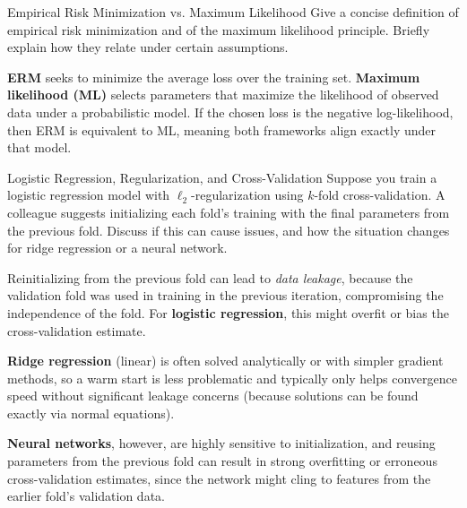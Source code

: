 \documentclass{article}
\begin{document}
\begin{exercise}{Empirical Risk Minimization vs. Maximum Likelihood}
  Give a concise definition of empirical risk minimization and of the maximum likelihood principle. Briefly explain how they relate under certain assumptions.

  \begin{solution}
    \textbf{ERM} seeks to minimize the average loss over the training set.  
    \textbf{Maximum likelihood (ML)} selects parameters that maximize the likelihood of observed data under a probabilistic model.  
    If the chosen loss is the negative log-likelihood, then ERM is equivalent to ML, meaning both frameworks align exactly under that model.
  \end{solution}
\end{exercise}

\begin{exercise}{Logistic Regression, Regularization, and Cross-Validation}
  Suppose you train a logistic regression model with $\ell_2$-regularization using $k$-fold cross-validation. A colleague suggests initializing each fold's training with the final parameters from the previous fold. Discuss if this can cause issues, and how the situation changes for ridge regression or a neural network.

  \begin{solution}
    Reinitializing from the previous fold can lead to \emph{data leakage}, because the validation fold was used in training in the previous iteration, compromising the independence of the fold. For \textbf{logistic regression}, this might overfit or bias the cross-validation estimate.  

    \textbf{Ridge regression} (linear) is often solved analytically or with simpler gradient methods, so a warm start is less problematic and typically only helps convergence speed without significant leakage concerns (because solutions can be found exactly via normal equations).  

    \textbf{Neural networks}, however, are highly sensitive to initialization, and reusing parameters from the previous fold can result in strong overfitting or erroneous cross-validation estimates, since the network might cling to features from the earlier fold’s validation data.
  \end{solution}
\end{exercise}
\end{document}
